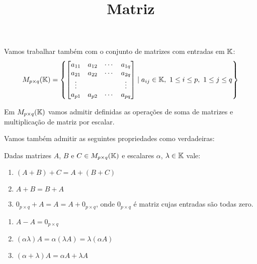 \documentclass{beamer}
\title{Matriz}
\author[\autor]{\autor}
\institute[\instituto]{\instituto}
\date{}
\begin{document}
    \begin{frame}
        \maketitle
    \end{frame}


    \begin{frame}
        Vamos trabalhar também com o conjunto de matrizes com entradas em $\mathbb{K}$:\pause
        \[
            M_{p \times q}(\mathbb{K}) =
            \left\{
                \begin{bmatrix}
                    a_{11} & a_{12} & \cdots & a_{1q}\\
                    a_{21} & a_{22} & \cdots & a_{2q}\\
                    \vdots & & & \vdots\\
                    a_{p1} & a_{p2} & \cdots & a_{pq}
                \end{bmatrix}
                \mid a_{ij} \in \mathbb{K},\ 1 \le i \le p,\ 1 \le j \le q
            \right\}
        \]
    \end{frame}

    \begin{frame}
        Em $M_{p\times q}(\mathbb{K})$ vamos admitir definidas as operações de soma de matrizes  e multiplicação de matriz por escalar.

        Vamos também admitir as seguintes propriedades como verdadeiras:
        \begin{proposicao}
            Dadas matrizes $A$, $B$ e $C \in M_{p\times q}(\mathbb{K})$  e escalares $\alpha$, $\lambda \in \mathbb{K}$ vale:
            \begin{enumerate}[label={\roman*})]
                \item $(A + B) + C = A + (B + C)$
                \item $A + B = B + A$
                \item $0_{p \times q} + A = A  = A + 0_{p \times q}$,  onde $0_{p \times q}$ é matriz cujas entradas são todas zero.
                \seti
            \end{enumerate}
        \end{proposicao}
    \end{frame}

    \begin{frame}
        \begin{proposicao}
            \begin{enumerate}[label={\roman*})]
                \conti
                \item $A - A = 0_{p \times q}$
                \item $(\alpha\lambda) A = \alpha(\lambda A)  = \lambda(\alpha A)$
                \item $(\alpha + \lambda)A =  \alpha A + \lambda A$
                \seti
            \end{enumerate}
        \end{proposicao}
    \end{frame}
\end{document}
